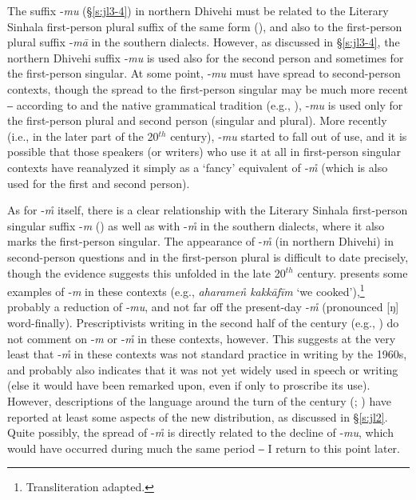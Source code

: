 \documentclass[output=paper]{langsci/langscibook}
\begin{document}
The suffix ‑\textit{mu} (§‎\ref{s:jl3-4}) in northern Dhivehi must be related to the Literary Sinhala first-person plural suffix of the same form (\citealt[168]{Fritz2002}), and also to the first-person plural suffix ‑\textit{mā} in the southern dialects. However, as discussed in §\ref{s:jl3-4}, the northern Dhivehi suffix ‑\textit{mu} is used also for the second person and sometimes for the first-person singular. At some point, ‑\textit{mu} must have spread to second-person contexts, though the spread to the first-person singular may be much more recent ‒ according to \cite{Geiger1919} and the native grammatical tradition (e.g., \citealt{Ahmad1970}), ‑\textit{mu} is used only for the first-person plural and second person (singular and plural). More recently (i.e., in the later part of the 20$^{th}$ century), ‑\textit{mu} started to fall out of use, and it is possible that those speakers (or writers) who use it at all in first-person singular contexts have reanalyzed it simply as a ‘fancy’ equivalent of ‑\textit{m̊} (which is also used for the first and second person). 

As for ‑\textit{m̊} itself, there is a clear relationship with the Literary Sinhala first-person singular suffix -\textit{m} (\citealt[168]{Fritz2002}) as well as with -\textit{m̊} in the southern dialects, where it also marks the first-person singular. The appearance of -\textit{m̊} (in northern Dhivehi) in second-person questions and in the first-person plural is difficult to date precisely, though the evidence suggests this unfolded in the late 20$^{th}$ century. \cite[83–88]{Geiger1919} presents some examples of ‑\textit{m} in these contexts (e.g., \textit{aharamen̊ kakkāfīm} ‘we cooked’),\footnote{Transliteration adapted.} probably a reduction of ‑\textit{mu}, and not far off the present-day ‑\textit{m̊} (pronounced [ŋ] word-finally). Prescriptivists writing in the second half of the century (e.g., \citealt{Ahmad1970}) do not comment on ‑\textit{m} or ‑\textit{m̊} in these contexts, however. This suggests at the very least that ‑\textit{m̊} in these contexts was not standard practice in writing by the 1960s, and probably also indicates that it was not yet widely used in speech or writing (else it would have been remarked upon, even if only to proscribe its use). However, descriptions of the language around the turn of the century (\citealt{CainGair2000}; \citealt{Fritz2002}) have reported at least some aspects of the new distribution, as discussed in §\ref{s:jl2}. Quite possibly, the spread of -\textit{m̊} is directly related to the decline of ‑\textit{mu}, which would have occurred during much the same period ‒ I return to this point later. 
\end{document}

